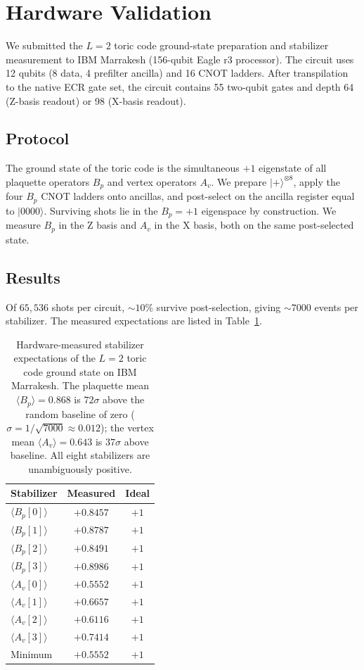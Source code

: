 \section{Hardware Validation}
\label{sec:hardware}

We submitted the $L = 2$ toric code ground-state preparation and
stabilizer measurement to IBM Marrakesh (156-qubit Eagle r3
processor).  The circuit uses 12 qubits (8 data, 4 prefilter
ancilla) and 16 CNOT ladders.  After transpilation to the native
ECR gate set, the circuit contains 55 two-qubit gates and depth
64 (Z-basis readout) or 98 (X-basis readout).

\subsection{Protocol}

The ground state of the toric code is the simultaneous $+1$
eigenstate of all plaquette operators $B_p$ and vertex operators
$A_v$.  We prepare $|{+}\rangle^{\otimes 8}$, apply the four
$B_p$ CNOT ladders onto ancillas, and post-select on the ancilla
register equal to $|0000\rangle$.  Surviving shots lie in the
$B_p = +1$ eigenspace by construction.  We measure $B_p$ in the
Z basis and $A_v$ in the X basis, both on the same post-selected
state.

\subsection{Results}

Of $65{,}536$ shots per circuit, $\sim 10\%$ survive
post-selection, giving $\sim 7000$ events per stabilizer.  The
measured expectations are listed in Table~\ref{tab:hardware}.

\begin{table}[h]
\centering
\begin{tabular}{lcc}
\hline
Stabilizer & Measured & Ideal \\
\hline
$\langle B_p[0] \rangle$ & $+0.8457$ & $+1$ \\
$\langle B_p[1] \rangle$ & $+0.8787$ & $+1$ \\
$\langle B_p[2] \rangle$ & $+0.8491$ & $+1$ \\
$\langle B_p[3] \rangle$ & $+0.8986$ & $+1$ \\
\hline
$\langle A_v[0] \rangle$ & $+0.5552$ & $+1$ \\
$\langle A_v[1] \rangle$ & $+0.6657$ & $+1$ \\
$\langle A_v[2] \rangle$ & $+0.6116$ & $+1$ \\
$\langle A_v[3] \rangle$ & $+0.7414$ & $+1$ \\
\hline
Minimum              & $+0.5552$ & $+1$ \\
\hline
\end{tabular}
\caption{Hardware-measured stabilizer expectations of the
$L = 2$ toric code ground state on IBM Marrakesh.  The plaquette
mean $\langle B_p \rangle = 0.868$ is $72\sigma$ above the random
baseline of zero ($\sigma = 1/\sqrt{7000} \approx 0.012$); the
vertex mean $\langle A_v \rangle = 0.643$ is $37\sigma$ above
baseline.  All eight stabilizers are unambiguously positive.}
\label{tab:hardware}
\end{table}

